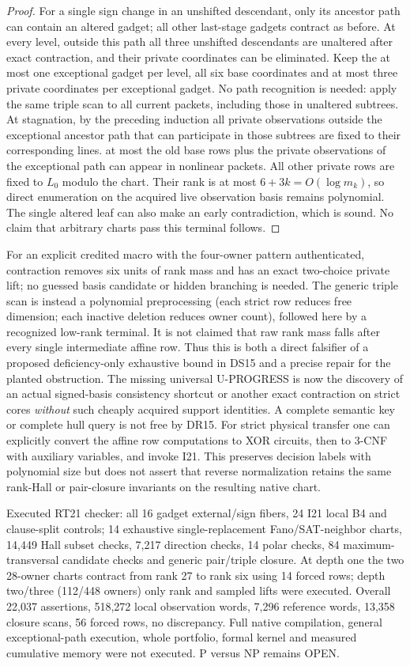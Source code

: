 \documentclass[11pt]{article}
\begin{document}
\begin{proof}
For a single sign change in an unshifted descendant, only its ancestor path can contain an altered gadget; all other last-stage gadgets contract as before. At every level, outside this path all three unshifted descendants are unaltered after exact contraction, and their private coordinates can be eliminated. Keep the at most one exceptional gadget per level, all six base coordinates and at most three private coordinates per exceptional gadget. No path recognition is needed: apply the same triple scan to all current packets, including those in unaltered subtrees. At stagnation, by the preceding induction all private observations outside the exceptional ancestor path that can participate in those subtrees are fixed to their corresponding lines. at most the old base rows plus the private observations of the exceptional path can appear in nonlinear packets. All other private rows are fixed to $L_0$ modulo the chart. Their rank is at most $6+3k=O(\log m_k)$, so direct enumeration on the acquired live observation basis remains polynomial. The single altered leaf can also make an early contradiction, which is sound. No claim that arbitrary charts pass this terminal follows.
\end{proof}
For an explicit credited macro with the four-owner pattern authenticated, contraction removes six units of rank mass and has an exact two-choice private lift; no guessed basis candidate or hidden branching is needed. The generic triple scan is instead a polynomial preprocessing (each strict row reduces free dimension; each inactive deletion reduces owner count), followed here by a recognized low-rank terminal. It is not claimed that raw rank mass falls after every single intermediate affine row. Thus this is both a direct falsifier of a proposed deficiency-only exhaustive bound in DS15 and a precise repair for the planted obstruction. The missing universal U-PROGRESS is now the discovery of an actual signed-basis consistency shortcut or another exact contraction on strict cores \emph{without} such cheaply acquired support identities. A complete semantic key or complete hull query is not free by DR15. For strict physical transfer one can explicitly convert the affine row computations to XOR circuits, then to 3-CNF with auxiliary variables, and invoke I21. This preserves decision labels with polynomial size but does not assert that reverse normalization retains the same rank-Hall or pair-closure invariants on the resulting native chart.

Executed RT21 checker: all 16 gadget external/sign fibers, 24 I21 local B4 and clause-split controls; 14 exhaustive single-replacement Fano/SAT-neighbor charts, 14,449 Hall subset checks, 7,217 direction checks, 14 polar checks, 84 maximum-transversal candidate checks and generic pair/triple closure. At depth one the two 28-owner charts contract from rank 27 to rank six using 14 forced rows; depth two/three (112/448 owners) only rank and sampled lifts were executed. Overall 22,037 assertions, 518,272 local observation words, 7,296 reference words, 13,358 closure scans, 56 forced rows, no discrepancy. Full native compilation, general exceptional-path execution, whole portfolio, formal kernel and measured cumulative memory were not executed. P versus NP remains OPEN.
\end{document}
